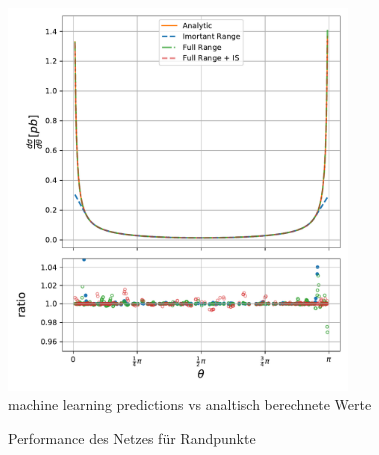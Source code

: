 \begin{figure}[tbp]
	\centering
	\includegraphics[width=9cm]{graphics/3}
	\caption{machine learning predictions vs analtisch berechnete Werte}
	\label{partonic_theta_model}
\end{figure}
\begin{figure}[tbp]
	\centering
	\caption{Performance des Netzes für Randpunkte}
	\label{3.1 / 3.2}
\end{figure}
